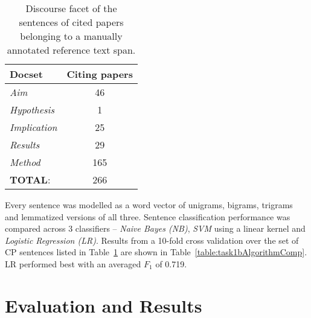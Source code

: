 \documentclass[11pt]{article}
\begin{document}
\begin{table}[h]\footnotesize
  \begin{center}
  \begin{tabular}{ |l | c |}
    \hline
    Docset & Citing papers \\ \hline
    \textit{Aim} & 46 \\ \hline
    \textit{Hypothesis} & 1 \\ \hline
    \textit{Implication} & 25 \\ \hline
    \textit{Results} & 29 \\ \hline
    \textit{Method} & 165 \\ \hline
    \hline
    \textbf{TOTAL}: & 266 \\ \hline
  \end{tabular}
  \caption{Discourse facet of the sentences of cited papers belonging to a manually annotated reference text span.}
  \label{table:task1bSentDistrib}
  \end{center}
\end{table}

Every sentence was modelled as a word vector of unigrams, 
bigrams, trigrams and lemmatized versions of all three.
Sentence classification performance was compared across 3 classifiers
-- \textit{Naive Bayes (NB)}, \textit{SVM} using a linear kernel and
\textit{Logistic Regression (LR)}. Results from a 10-fold cross
validation over the set of CP sentences listed in
Table~\ref{table:task1bSentDistrib} are shown in
Table~\ref{table:task1bAlgorithmComp}.  LR performed best with an
averaged $F_1$ of 0.719.

\section{Evaluation and Results}
\end{document}
